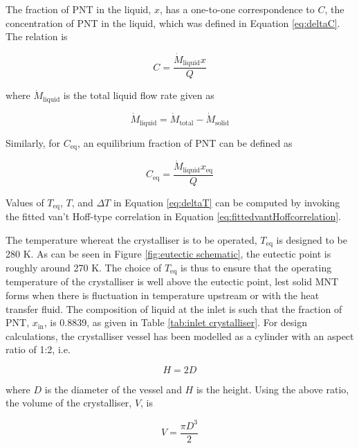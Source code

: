 The fraction of PNT in the liquid, $x$, has a one-to-one correspondence to $C$, the concentration of PNT in the liquid, which was defined in Equation \ref{eq:deltaC}. The relation is 

\begin{equation}
    C = \frac{\dot{M}_{\mathrm{liquid}} x}{Q}
\end{equation}

\noindent where $\dot{M}_{\mathrm{liquid}}$ is the total liquid flow rate given as 

\begin{equation}
    \dot{M}_{\mathrm{liquid}} = \dot{M}_{\mathrm{total}} - \dot{M}_{\mathrm{solid}}
\end{equation}

\noindent Similarly, for $C_{\mathrm{eq}}$, an equilibrium fraction of PNT can be defined as

\begin{equation}
    C_{\mathrm{eq}} = \frac{\dot{M}_{\mathrm{liquid}} x_{\mathrm{eq}}}{Q}
\end{equation}

\noindent Values of $T_{\mathrm{eq}}$, $T$, and $\Delta T$ in Equation \ref{eq:deltaT} can be computed by invoking the fitted van't Hoff-type correlation in Equation \ref{eq:fittedvantHoffcorrelation}. 

The temperature whereat the crystalliser is to be operated, $T_{\mathrm{eq}}$ is designed to be 280 K. As can be seen in Figure \ref{fig:eutectic schematic}, the eutectic point is roughly around 270 K. The choice of $T_{\mathrm{eq}}$ is thus to ensure that the operating temperature of the crystalliser is well above the eutectic point, lest solid MNT forms when there is fluctuation in temperature upstream or with the heat transfer fluid. The composition of liquid at the inlet is such that the fraction of PNT, $x_{\mathrm{in}}$, is 0.8839, as given in Table \ref{tab:inlet crystalliser}. For design calculations, the crystalliser vessel has been modelled as a cylinder with an aspect ratio of 1:2, i.e. 

\begin{equation}
    H = 2D
\end{equation}

\noindent where $D$ is the diameter of the vessel and $H$ is the height. Using the above ratio, the volume of the crystalliser, $V$, is

\begin{equation} \label{eq:crystalliser volume}
    V = \frac{\pi D^3}{2} 
\end{equation}


